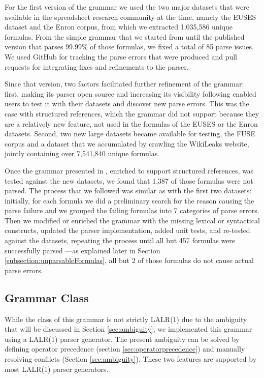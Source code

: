 \documentclass[times]{smrauth}
\begin{document}
For the first version of the grammar \cite{XLparser} we used the two major datasets that were available in the spreadsheet research community at the time, namely the EUSES dataset \cite{euses} and the Enron \cite{enron} corpus, from which we extracted 1,035,586 unique formulas. From the simple grammar that we started from until the published version that parses 99.99\% of those formulas, we fixed a total of 85 parse issues. We used GitHub for tracking the parse errors that were produced and pull requests for integrating fixes and refinements to the parser.

Since that version, two factors facilitated further refinement of the grammar: first, making its parser open source and increasing its visibility following \cite{XLparser} enabled users to test it with their datasets and discover new parse errors. This was the case with structured references, which the grammar did not support because they are a relatively new feature, not used in the formulas of the EUSES or the Enron datasets. Second, two new large datasets became available for testing, the FUSE corpus \cite{fuse} and a dataset that we accumulated by crawling the WikiLeaks website, jointly containing over 7,541,840 unique formulas.

Once the grammar presented in \cite{XLparser}, enriched to support structured references, was tested against the new datasets, we found that 1,387 of those formulas were not parsed. The process that we followed was similar as with the first two datasets: initially, for each formula we did a preliminary search for the reason causing the parse failure and we grouped the failing formulas into 7 categories of parse errors. Then we modified or enriched the grammar with the missing lexical or syntactical constructs, updated the parser implementation, added unit tests, and re-tested against the datasets, repeating the process until all but 457 formulas were successfully parsed ---as explained later in Section \ref{subsection:unparsableFormulas}, all but 2 of those formulas do not cause actual parse errors.

\subsection{Grammar Class}
\label{sec:grammarclass}
While the class of this grammar is not strictly LALR(1) due to the ambiguity that will be discussed in Section \ref{sec:ambiguity}, we implemented this grammar using a LALR(1) parser generator.
The present ambiguity can be solved by defining operator precedence (section \ref{sec:operatorprecedence}) and manually resolving conflicts (Section \ref{sec:ambiguity}).
These two features are supported by most LALR(1) parser generators.
\end{document}
